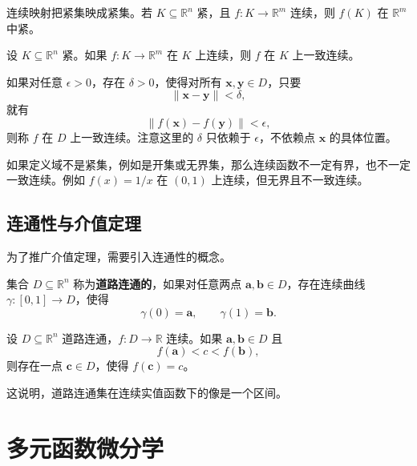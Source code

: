 \begin{theorem}[紧性与连续映射]
连续映射把紧集映成紧集。若 $K\subseteq\mathbb{R}^n$ 紧，且 $f:K\to\mathbb{R}^m$ 连续，则 $f(K)$ 在 $\mathbb{R}^m$ 中紧。
\end{theorem}

\begin{theorem}[一致连续性]
设 $K\subseteq\mathbb{R}^n$ 紧。如果 $f:K\to\mathbb{R}^m$ 在 $K$ 上连续，则 $f$ 在 $K$ 上一致连续。
\end{theorem}

\begin{definition}[一致连续]
如果对任意 $\epsilon>0$，存在 $\delta>0$，使得对所有 $\mathbf{x},\mathbf{y}\in D$，只要
\[
    \|\mathbf{x}-\mathbf{y}\|<\delta,
\]
就有
\[
    \|f(\mathbf{x})-f(\mathbf{y})\|<\epsilon,
\]
则称 $f$ 在 $D$ 上一致连续。注意这里的 $\delta$ 只依赖于 $\epsilon$，不依赖点 $\mathbf{x}$ 的具体位置。
\end{definition}

\begin{remark}
如果定义域不是紧集，例如是开集或无界集，那么连续函数不一定有界，也不一定一致连续。例如 $f(x)=1/x$ 在 $(0,1)$ 上连续，但无界且不一致连续。
\end{remark}

\subsection{连通性与介值定理}

为了推广介值定理，需要引入连通性的概念。

\begin{definition}[道路连通集]
集合 $D\subseteq\mathbb{R}^n$ 称为\textbf{道路连通的}，如果对任意两点 $\mathbf{a},\mathbf{b}\in D$，存在连续曲线 $\gamma:[0,1]\to D$，使得
\[
    \gamma(0)=\mathbf{a},\qquad \gamma(1)=\mathbf{b}.
\]
\end{definition}

\newpage

\begin{theorem}[广义介值定理]
设 $D\subseteq\mathbb{R}^n$ 道路连通，$f:D\to\mathbb{R}$ 连续。如果 $\mathbf{a},\mathbf{b}\in D$ 且
\[
    f(\mathbf{a})<c<f(\mathbf{b}),
\]
则存在一点 $\mathbf{c}\in D$，使得 $f(\mathbf{c})=c$。
\end{theorem}

这说明，道路连通集在连续实值函数下的像是一个区间。


\section{多元函数微分学}


